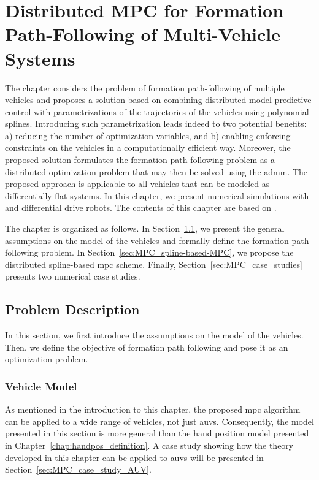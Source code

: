 \chapter{Distributed MPC for Formation Path-Following of Multi-Vehicle Systems}
\label{chap:handpos_MPC}


The chapter considers the problem of formation path-following of multiple vehicles and proposes a solution based on combining distributed model predictive control with parametrizations of the trajectories of the vehicles using polynomial splines. Introducing such parametrization leads indeed to two potential benefits: a) reducing the number of optimization variables, and b) enabling enforcing constraints on the vehicles in a computationally efficient way. Moreover, the proposed solution formulates the formation path-following problem as a distributed optimization problem that may then be solved using the \gls{admm}.
The proposed approach is applicable to all vehicles that can be modeled as differentially flat systems.
In this chapter, we present numerical simulations with  and differential drive robots.
The contents of this chapter are based on \cite{matous_MPC_2022}.

The chapter is organized as follows.
In Section~\ref{sec:MPC_problem-description}, we present the general assumptions on the model of the vehicles and formally define the formation path-following problem.
In Section~\ref{sec:MPC_spline-based-MPC}, we propose the distributed spline-based \gls{mpc} scheme.
Finally, Section~\ref{sec:MPC_case_studies} presents two numerical case studies.

\section{Problem Description}
\label{sec:MPC_problem-description}

In this section, we first introduce the assumptions on the model of the vehicles.
Then, we define the objective of formation path following and pose it as an optimization problem.



\subsection{Vehicle Model}
\label{ssec:MPC_vehicle-model}

As mentioned in the introduction to this chapter, the proposed \gls{mpc} algorithm can be applied to a wide range of vehicles, not just \glspl{auv}.
Consequently, the model presented in this section is more general than the hand position model presented in Chapter~\ref{chap:handpos_definition}.
A case study showing how the theory developed in this chapter can be applied to \glspl{auv} will be presented in Section~\ref{sec:MPC_case_study_AUV}.

